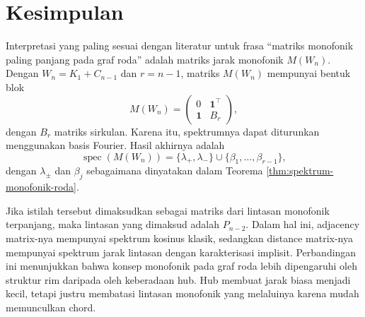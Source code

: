 \documentclass[12pt,a4paper]{article}
\theoremstyle{definition}
\newcommand{\spec}{\operatorname{spec}}
\newcommand{\one}{\mathbf{1}}
\begin{document}
\section{Kesimpulan}

Interpretasi yang paling sesuai dengan literatur untuk frasa ``matriks monofonik paling panjang pada graf roda'' adalah matriks jarak monofonik $M(W_n)$. Dengan $W_n=K_1+C_{n-1}$ dan $r=n-1$, matriks $M(W_n)$ mempunyai bentuk blok
\[
  M(W_n)=
  \begin{pmatrix}
    0    & \one^\top \\
    \one & B_r
  \end{pmatrix},
\]
dengan $B_r$ matriks sirkulan. Karena itu, spektrumnya dapat diturunkan menggunakan basis Fourier. Hasil akhirnya adalah
\[
  \spec(M(W_n))=\{\lambda_+,\lambda_-\}\cup\{\beta_1,\ldots,\beta_{r-1}\},
\]
dengan $\lambda_\pm$ dan $\beta_j$ sebagaimana dinyatakan dalam Teorema \ref{thm:spektrum-monofonik-roda}.

Jika istilah tersebut dimaksudkan sebagai matriks dari lintasan monofonik terpanjang, maka lintasan yang dimaksud adalah $P_{n-2}$. Dalam hal ini, adjacency matrix-nya mempunyai spektrum kosinus klasik, sedangkan distance matrix-nya mempunyai spektrum jarak lintasan dengan karakterisasi implisit. Perbandingan ini menunjukkan bahwa konsep monofonik pada graf roda lebih dipengaruhi oleh struktur rim daripada oleh keberadaan hub. Hub membuat jarak biasa menjadi kecil, tetapi justru membatasi lintasan monofonik yang melaluinya karena mudah memunculkan chord.



\end{document}
